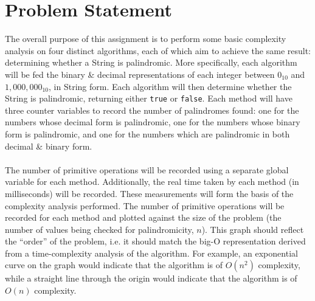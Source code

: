 \documentclass[a4paper]{article}
\begin{document}
\section{Problem Statement}
The overall purpose of this assignment is to perform some basic complexity analysis on four distinct algorithms, each of which aim to achieve the same result: determining whether a String is palindromic.
More specifically, each algorithm will be fed the binary \& decimal representations of each integer between $0_{10}$ and $1,000,000_{10}$, in String form.
Each algorithm will then determine whether the String is palindromic, returning either \verb|true| or \verb|false|. 
Each method will have three counter variables to record the number of palindromes found: one for the numbers whose decimal form is palindromic, one for the numbers whose binary form is palindromic, and one 
for the numbers which are palindromic in both decimal \& binary form.
\\\\
The number of primitive operations will be recorded using a separate global variable for each method. 
Additionally, the real time taken by each method (in milliseconds) will be recorded. 
These measurements will form the basis of the complexity analysis performed.
The number of primitive operations will be recorded for each method and plotted against the size of the problem (the number of values being checked for palindromicity, $n$).
This graph should reflect the ``order'' of the problem, i.e. it should match the big-O representation derived from a time-complexity analysis of the algorithm.
For example, an exponential curve on the graph would indicate that the algorithm is of $O(n^2)$ complexity, while a straight line through the origin would indicate that the algorithm is of $O(n)$ complexity.
\end{document}
